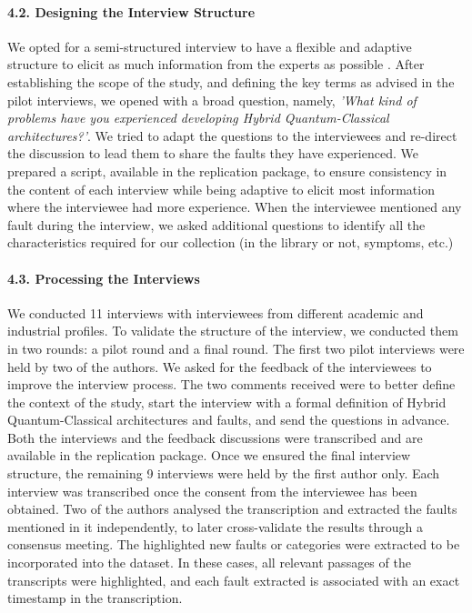 \paragraph*{4.2. Designing the Interview Structure}

We opted for a semi-structured interview to have a flexible and adaptive structure to elicit as much information from the experts as possible \cite{seaman_qualitative_1999}. After establishing the scope of the study, and defining the key terms as advised in the pilot interviews, we opened with a broad question, namely, \textit{'What kind of problems have you experienced developing Hybrid Quantum-Classical architectures?'}. We tried to adapt the questions to the interviewees and re-direct the discussion to lead them to share the faults they have experienced. We prepared a script, available in the replication package, to ensure consistency in the content of each interview while being adaptive to elicit most information where the interviewee had more experience. When the interviewee mentioned any fault during the interview, we asked additional questions to identify all the characteristics required for our collection (in the library or not, symptoms, etc.)

\paragraph*{4.3. Processing the Interviews}
We conducted 11 interviews with interviewees from different academic and industrial profiles. To validate the structure of the interview, we conducted them in two rounds: a pilot round and a final round. 
The first two pilot interviews were held by two of the authors. We asked for the feedback of the interviewees to improve the interview process. The two comments received were to better define the context of the study, start the interview with a formal definition of Hybrid Quantum-Classical architectures and faults, and send the questions in advance. Both the interviews and the feedback discussions were transcribed and are available in the replication package. Once we ensured the final interview structure, the remaining 9 interviews were held by the first author only. Each interview was transcribed once the consent from the interviewee has been obtained. Two of the authors analysed the transcription and extracted the faults mentioned in it independently, to later cross-validate the results through a consensus meeting. The highlighted new faults or categories were extracted to be incorporated into the dataset. In these cases, all relevant passages of the transcripts were highlighted, and each fault extracted is associated with an exact timestamp in the transcription. %

